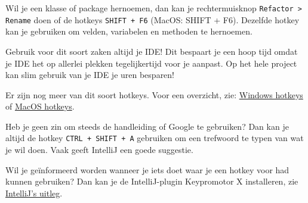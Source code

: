 Wil je een klasse of package hernoemen, dan kan je rechtermuisknop 
\texttt{Refactor > Rename} doen of de hotkeys \texttt{SHIFT + F6} (MacOS: SHIFT + F6).
Dezelfde hotkey kan je gebruiken om velden, variabelen en methoden te hernoemen.

Gebruik voor dit soort zaken altijd je IDE! Dit bespaart je een hoop tijd omdat je IDE 
het op allerlei plekken tegelijkertijd voor je aanpast. Op het hele project kan slim gebruik 
van je IDE je uren besparen! 

Er zijn nog meer van dit soort hotkeys. 
Voor een overzicht, zie: \href{https://www.jetbrains.com/help/idea/reference-keymap-win-default.html}{Windows hotkeys} 
of \href{https://www.jetbrains.com/help/idea/reference-keymap-mac-default.html}{MacOS hotkeys}.

Heb je geen zin om steeds de handleiding of Google te gebruiken? Dan kan je altijd de hotkey 
\texttt{CTRL + SHIFT + A} gebruiken om een trefwoord te typen van wat je wil doen.
Vaak geeft IntelliJ een goede suggestie. 

Wil je geïnformeerd worden wanneer je iets doet waar je een hotkey voor had kunnen gebruiken?
Dan kan je de IntelliJ-plugin Keypromotor X installeren, zie 
\href{https://www.jetbrains.com/help/idea/mastering-keyboard-shortcuts.html#learn-shortcuts}{IntelliJ's uitleg}.
